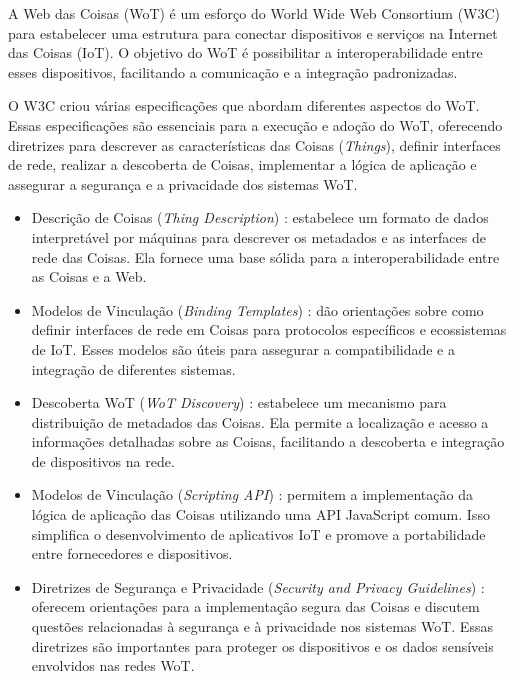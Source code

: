 A Web das Coisas (WoT) é um esforço do World Wide Web Consortium (W3C) para estabelecer uma estrutura para conectar dispositivos e serviços na Internet das Coisas (IoT). O objetivo do WoT é possibilitar a interoperabilidade entre esses dispositivos, facilitando a comunicação e a integração padronizadas.

O W3C criou várias especificações que abordam diferentes aspectos do WoT. Essas especificações são essenciais para a execução e adoção do WoT, oferecendo diretrizes para descrever as características das Coisas (\textit{Things}), definir interfaces de rede, realizar a descoberta de Coisas, implementar a lógica de aplicação e assegurar a segurança e a privacidade dos sistemas WoT.

\begin{itemize}
\item Descrição de Coisas (\textit{Thing Description}) : estabelece um formato de dados interpretável por máquinas para descrever os metadados e as interfaces de rede das Coisas. Ela fornece uma base sólida para a interoperabilidade entre as Coisas e a Web.
\item Modelos de Vinculação (\textit{Binding Templates}) : dão orientações sobre como definir interfaces de rede em Coisas para protocolos específicos e ecossistemas de IoT. Esses modelos são úteis para assegurar a compatibilidade e a integração de diferentes sistemas.
\item Descoberta WoT (\textit{WoT Discovery}) : estabelece um mecanismo para distribuição de metadados das Coisas. Ela permite a localização e acesso a informações detalhadas sobre as Coisas, facilitando a descoberta e integração de dispositivos na rede.
\item Modelos de Vinculação (\textit{Scripting API}) : permitem a implementação da lógica de aplicação das Coisas utilizando uma API JavaScript comum. Isso simplifica o desenvolvimento de aplicativos IoT e promove a portabilidade entre fornecedores e dispositivos.
\item Diretrizes de Segurança e Privacidade (\textit{Security and Privacy Guidelines}) : oferecem orientações para a implementação segura das Coisas e discutem questões relacionadas à segurança e à privacidade nos sistemas WoT. Essas diretrizes são importantes para proteger os dispositivos e os dados sensíveis envolvidos nas redes WoT.
\end{itemize}

